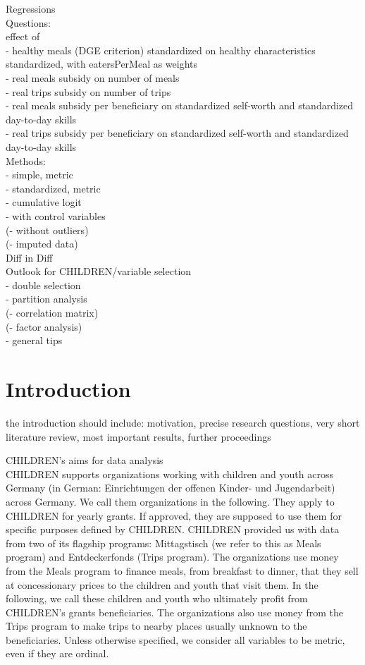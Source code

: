 \documentclass[12pt, a4paper, titlepage]{article}\usepackage[]{graphicx}\usepackage[]{color}
\begin{document}
Regressions\\

Questions:\\
effect of\\
- healthy meals (DGE criterion) standardized on healthy characteristics standardized, with eatersPerMeal as weights\\
- real meals subsidy on number of meals\\
- real trips subsidy on number of trips\\
- real meals subsidy per beneficiary on standardized self-worth and standardized day-to-day skills\\
- real trips subsidy per beneficiary on standardized self-worth and standardized day-to-day skills\\

Methods:\\
- simple, metric\\
- standardized, metric\\
- cumulative logit\\
- with control variables\\
(- without outliers)\\
(- imputed data)\\

Diff in Diff\\

Outlook for CHILDREN/variable selection\\
- double selection \\
- partition analysis\\
(- correlation matrix)\\
(- factor analysis)\\
- general tips\\

\section{Introduction}

the introduction should include: motivation, precise research questions, very short literature review, most important results, further proceedings

CHILDREN's aims for data analysis\\ 
CHILDREN supports organizations working with children and youth across Germany (in German: Einrichtungen der offenen Kinder- und Jugendarbeit) across Germany. We call them organizations in the following. They apply to CHILDREN for yearly grants. If approved, they are supposed to use them for specific purposes defined by CHILDREN. CHILDREN provided us with data from two of its flagship programs: Mittagstisch (we refer to this as Meals program) and Entdeckerfonds (Trips program). The organizations use money from the Meals program to finance meals, from breakfast to dinner, that they sell at concessionary prices to the children and youth that visit them. In the following, we call these children and youth who ultimately profit from CHILDREN's grants beneficiaries. The organizations also use money from the Trips program to make trips to nearby places usually unknown to the beneficiaries.  
Unless otherwise specified, we consider all variables to be metric, even if they are ordinal. 
\end{document}
